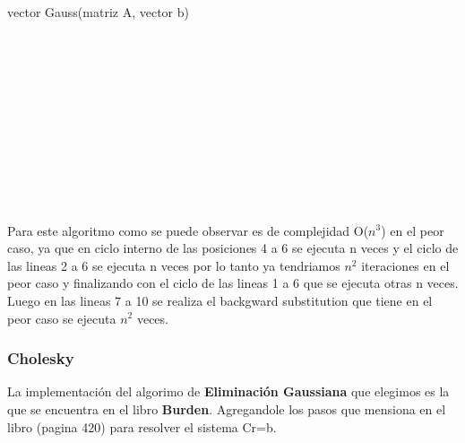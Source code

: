 \begin{algorithm}
    \begin{algorithmic}[1]\parskip=1mm
        \caption{vector Gauss(matriz A, vector b)}
        \\
        \\
        \\
        \\
        \\
        \\
        \\
        \\
        \\
        \\
    \end{algorithmic}
\end{algorithm}

Para este algoritmo como se puede observar es de complejidad O($n^3$) en el peor caso, ya que en ciclo interno de las posiciones 4 a 6 se ejecuta n veces y el ciclo de las lineas 2 a 6 se ejecuta n veces por lo tanto ya tendriamos $n^2$ iteraciones en el peor caso y finalizando con el ciclo de las lineas 1 a 6 que se ejecuta otras n veces.
Luego en las lineas 7 a 10 se realiza el backgward substitution  que tiene en el peor caso se ejecuta $n^2$ veces.\\

\subsubsection{Cholesky}

La implementación del algorimo de \textbf{Eliminación Gaussiana} que elegimos es la que se encuentra en el libro \textbf{Burden}.
Agregandole los pasos que mensiona en el libro (pagina 420) para resolver el sistema Cr=b.\\

